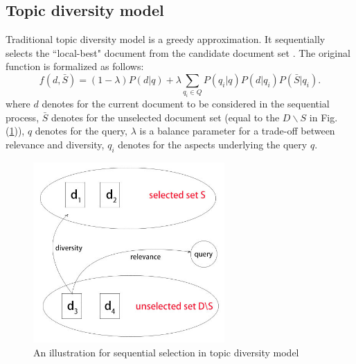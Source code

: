\documentclass[review]{elsarticle}
\newcommand\revised[1]{{\color{black} #1}}
\begin{document}

\subsection{Topic diversity model}
\revised{
Traditional topic diversity model is a greedy approximation. It sequentially selects the ``local-best" document from the candidate document set \cite{santos2010exploiting}. The original function is formalized as follows:}
\begin{equation}
	f(d, \bar{S})=(1-\lambda)P(d|q)+\lambda\sum_{q_i\in Q}P(q_i|q)P(d|q_i)P(\bar{S}|q_i).
	\label{eq1}
 \end{equation}
where $d$ denotes for the current document to be considered in the sequential process, $\bar{S}$ denotes for the unselected document set (equal to the $D\backslash S$ in Fig. (\ref{fig_rank})), $q$ denotes for the query, $\lambda$ is a balance parameter for a trade-off between relevance and diversity, $q_i$ denotes for the aspects underlying the query $q$. 

\begin{figure}[htb]
	\centering\includegraphics[width=0.65\textwidth]{fig_rank}
	\caption{An illustration for sequential selection in topic diversity model}
	\label{fig_rank}
\end{figure}
\end{document}

